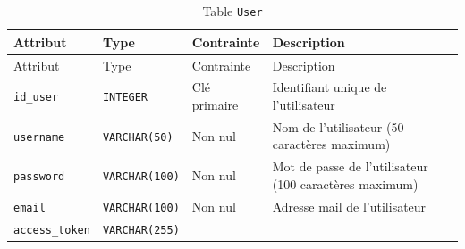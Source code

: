 \documentclass[a4paper,12pt]{article}
\begin{document}
\begin{longtable}[]{@{}
  >{\raggedright\arraybackslash}p{}
  >{\raggedright\arraybackslash}p{}
  >{\raggedright\arraybackslash}p{}
  >{\raggedright\arraybackslash}p{}@{}}
\caption{Table \protect\texttt{User}}\tabularnewline
\toprule\noalign{}
\begin{minipage}[b]{\linewidth}\raggedright
Attribut
\end{minipage} & \begin{minipage}[b]{\linewidth}\raggedright
Type
\end{minipage} & \begin{minipage}[b]{\linewidth}\raggedright
Contrainte
\end{minipage} & \begin{minipage}[b]{\linewidth}\raggedright
Description
\end{minipage} \\
\midrule\noalign{}
\endfirsthead
\toprule\noalign{}
\begin{minipage}[b]{\linewidth}\raggedright
Attribut
\end{minipage} & \begin{minipage}[b]{\linewidth}\raggedright
Type
\end{minipage} & \begin{minipage}[b]{\linewidth}\raggedright
Contrainte
\end{minipage} & \begin{minipage}[b]{\linewidth}\raggedright
Description
\end{minipage} \\
\midrule\noalign{}
\endhead
\bottomrule\noalign{}
\endlastfoot
\texttt{id\_user} & \texttt{INTEGER} & Clé primaire & Identifiant unique
de l'utilisateur \\
\texttt{username} & \texttt{VARCHAR(\allowbreak{}50)\allowbreak{}} & Non
nul & Nom de l'utilisateur (50 caractères maximum) \\
\texttt{password} & \texttt{VARCHAR(\allowbreak{}100)\allowbreak{}} &
Non nul & Mot de passe de l'utilisateur (100 caractères maximum) \\
\texttt{email} & \texttt{VARCHAR(\allowbreak{}100)\allowbreak{}} & Non
nul & Adresse mail de l'utilisateur \\
\texttt{access\_\allowbreak{}token} &
\texttt{VARCHAR(\allowbreak{}255)\allowbreak{}} & & \\
\end{longtable}
\end{document}
